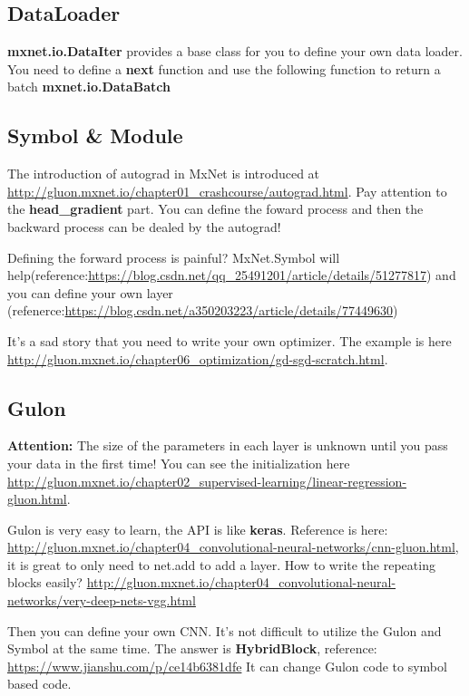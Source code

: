 \documentclass[english]{../TeXTemplate/pkupaper}
\begin{document}
\subsection{DataLoader}

\textbf{mxnet.io.DataIter} provides a base class for you to define your own data loader. You need to define a \textbf{next} function and use the following function to return a batch \textbf{mxnet.io.DataBatch}



\subsection{Symbol \& Module}


The introduction of autograd in MxNet is introduced at \url{http://gluon.mxnet.io/chapter01_crashcourse/autograd.html}. Pay attention to the \textbf{head\_gradient} part. You can define the foward process and then the backward process can be dealed by the autograd!

Defining the forward process is painful? MxNet.Symbol will help(reference:\url{https://blog.csdn.net/qq_25491201/article/details/51277817}) and you can define your own layer (refenerce:\url{https://blog.csdn.net/a350203223/article/details/77449630})

It's a sad story that you need to write your own optimizer. The example is here \url{http://gluon.mxnet.io/chapter06_optimization/gd-sgd-scratch.html}.

\subsection{Gulon}

\textbf{Attention:} The size of the parameters in each layer is unknown until you pass your data in the first time! You can see the initialization here \url{http://gluon.mxnet.io/chapter02_supervised-learning/linear-regression-gluon.html}.



Gulon is very easy to learn, the API is like \textbf{keras}. Reference is here: \url{http://gluon.mxnet.io/chapter04_convolutional-neural-networks/cnn-gluon.html}, it is great to only need to net.add to add a layer. How to write the repeating blocks easily? \url{http://gluon.mxnet.io/chapter04_convolutional-neural-networks/very-deep-nets-vgg.html}

Then you can define your own CNN. It's not difficult to utilize the Gulon and Symbol at the same time. The answer is \textbf{HybridBlock}, reference: \url{https://www.jianshu.com/p/ce14b6381dfe} It can change Gulon code to symbol based code.
\end{document}
